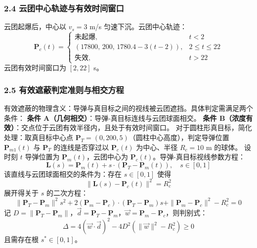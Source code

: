 \documentclass{JXUSTmodeling}
\begin{document}
\subsubsection{2.4 云团中心轨迹与有效时间窗口}
云团起爆后，中心以 $v_s = 3$ m/s 匀速下沉。云团中心轨迹：
\begin{equation}
\mathbf{P}_c(t) = \begin{cases}
\text{未起爆}, & t < 2 \\
(17800, \, 200, \, 1780.4 - 3(t-2)), & 2 \leq t \leq 22 \\
\text{失效}, & t > 22
\end{cases} \tag{6}
\end{equation}
云团有效时间窗口为 $[2, 22]$ s。
\subsubsection{2.5 有效遮蔽判定准则与相交方程}
有效遮蔽的物理含义：导弹与真目标之间的视线被云团遮挡。具体判定需满足两个条件：
\textbf{条件 A（几何相交）}：导弹-真目标连线与云团球面相交。
\textbf{条件 B（浓度有效）}：交点位于云团有效半径内，且处于有效时间窗口。
对于圆柱形真目标，简化处理：取真目标中心点 $\mathbf{P}_T = (0, 200, 5)$（圆柱中心高度），判定导弹位置 $\mathbf{P}_{m1}(t)$ 与 $\mathbf{P}_T$ 的连线是否穿过以 $\mathbf{P}_c(t)$ 为中心、半径 $R_c = 10$ m 的球体。
设时刻 $t$ 导弹位置为 $\mathbf{P}_m(t)$，云团中心为 $\mathbf{P}_c(t)$。导弹-真目标视线参数方程：
\begin{equation}
\mathbf{L}(s) = \mathbf{P}_m(t) + s \cdot (\mathbf{P}_T - \mathbf{P}_m(t)), \quad s \in [0,1] \tag{7}
\end{equation}
该直线与云团球面相交的条件为：存在 $s \in [0,1]$ 使得
\begin{equation}
\|\mathbf{L}(s) - \mathbf{P}_c(t)\|^2 = R_c^2 \tag{8}
\end{equation}
展开得关于 $s$ 的二次方程：
\begin{equation}
\|\mathbf{P}_T - \mathbf{P}_m\|^2 s^2 + 2(\mathbf{P}_m - \mathbf{P}_c) \cdot (\mathbf{P}_T - \mathbf{P}_m) s + \|\mathbf{P}_m - \mathbf{P}_c\|^2 - R_c^2 = 0 \tag{9}
\end{equation}
记 $D = \|\mathbf{P}_T - \mathbf{P}_m\|$，$\vec{d} = \mathbf{P}_T - \mathbf{P}_m$，$\vec{w} = \mathbf{P}_m - \mathbf{P}_c$，则判别式：
\begin{equation}
\Delta = 4(\vec{w} \cdot \vec{d})^2 - 4D^2(\|\vec{w}\|^2 - R_c^2) \geq 0 \tag{10}
\end{equation}
且需存在根 $s^* \in [0,1]$。
\end{document}
